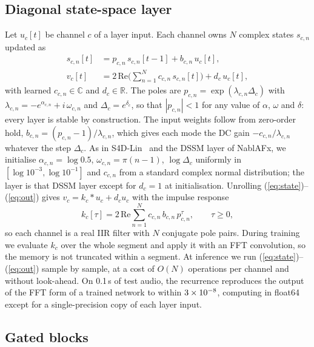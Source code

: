 \documentclass{article}
\newcommand{\C}{\mathbb{C}}
\newcommand{\R}{\mathbb{R}}
\begin{document}
\subsection{Diagonal state-space layer}

Let $u_c[t]$ be channel $c$ of a layer input. Each channel owns $N$ complex
states $s_{c,n}$ updated as
\begin{align}
s_{c,n}[t] &= p_{c,n}\, s_{c,n}[t-1] + b_{c,n}\, u_c[t], \label{eq:state}\\
v_c[t] &= 2\,\mathrm{Re}\Big(\textstyle\sum_{n=1}^{N} c_{c,n}\, s_{c,n}[t]\Big) + d_c\, u_c[t], \label{eq:out}
\end{align}
with learned $c_{c,n} \in \C$ and $d_c \in \R$. The poles are
$p_{c,n} = \exp(\lambda_{c,n}\Delta_c)$ with $\lambda_{c,n} = -e^{\alpha_{c,n}}
+ i\,\omega_{c,n}$ and $\Delta_c = e^{\delta_c}$, so that $|p_{c,n}| < 1$ for any
value of $\alpha$, $\omega$ and $\delta$: every layer is stable by construction.
The input weights follow from zero-order hold, $b_{c,n} = (p_{c,n} -
1)/\lambda_{c,n}$, which gives each mode the DC gain $-c_{c,n}/\lambda_{c,n}$
whatever the step $\Delta_c$. As in S4D-Lin~\cite{gu2022s4d} and the DSSM layer
of NablAFx, we initialise $\alpha_{c,n} = \log 0.5$, $\omega_{c,n} = \pi (n-1)$,
$\log\Delta_c$ uniformly in $[\log 10^{-3}, \log 10^{-1}]$ and $c_{c,n}$ from a
standard complex normal distribution; the layer is that DSSM layer except for
$d_c = 1$ at initialisation. Unrolling
(\ref{eq:state})--(\ref{eq:out}) gives $v_c = k_c * u_c + d_c u_c$ with the
impulse response
\begin{equation}
k_c[\tau] = 2\,\mathrm{Re}\textstyle\sum_{n=1}^{N} c_{c,n}\, b_{c,n}\, p_{c,n}^{\tau}, \qquad \tau \geq 0,
\label{eq:kernel}
\end{equation}
so each channel is a real IIR filter with $N$ conjugate pole pairs. During
training we evaluate $k_c$ over the whole segment and apply it with an FFT
convolution, so the memory is not truncated within a segment. At inference we
run (\ref{eq:state})--(\ref{eq:out}) sample by sample, at a cost of $O(N)$
operations per channel and without look-ahead. On 0.1\,s of test audio, the
recurrence reproduces the output of the FFT form of a trained network to within
$3\times10^{-8}$, computing in float64 except for a single-precision copy
of each layer input.

\subsection{Gated blocks}
\end{document}
